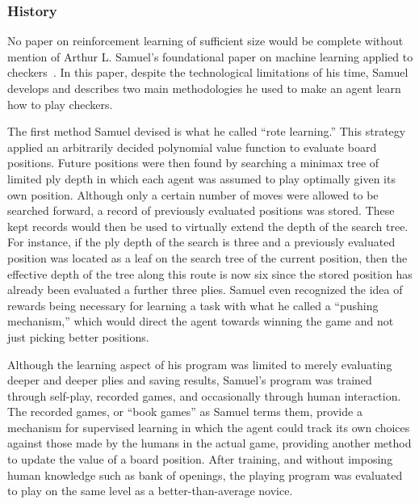 

\subsubsection*{History}


No paper on reinforcement learning of sufficient size would be complete without
mention of Arthur L. Samuel's foundational paper on machine learning applied to
checkers~\cite{samuel_checkers}.
%
In this paper,
despite the technological limitations of his time,
Samuel develops and describes two main methodologies he used to make an agent
learn how to play checkers.

The first method Samuel devised is what he called ``rote learning.''
%
This strategy applied an arbitrarily decided polynomial value function
to evaluate board positions.
%
Future positions were then found by searching a minimax tree
of limited ply depth
in which each agent was assumed to play optimally given its own position.
%
Although only a certain number of moves were allowed to be searched forward,
a record of previously evaluated positions was stored.
%
These kept records would then be used to virtually extend the depth of the
search tree.
%
For instance,
if the ply depth of the search is three and a previously evaluated position was
located as a leaf on the search tree of the current position,
then the effective depth of the tree along this route is now six since the
stored position has already been evaluated a further three plies.
%
Samuel even recognized the idea of rewards being necessary for learning a task
with what he called a ``pushing mechanism,'' which would direct the agent towards
winning the game and not just picking better positions.

Although the learning aspect of his program was limited to merely evaluating
deeper and deeper plies and saving results,
Samuel's program was trained through self-play, recorded games, and occasionally
through human interaction.
%
The recorded games, or ``book games'' as Samuel terms them,
provide a mechanism for supervised learning in which the agent could track its
own choices against those made by the humans in the actual game,
providing another method to update the value of a board position.
%
After training,
and without imposing human knowledge such as bank of openings,
the playing program was evaluated to play on the same level as a
better-than-average novice.

